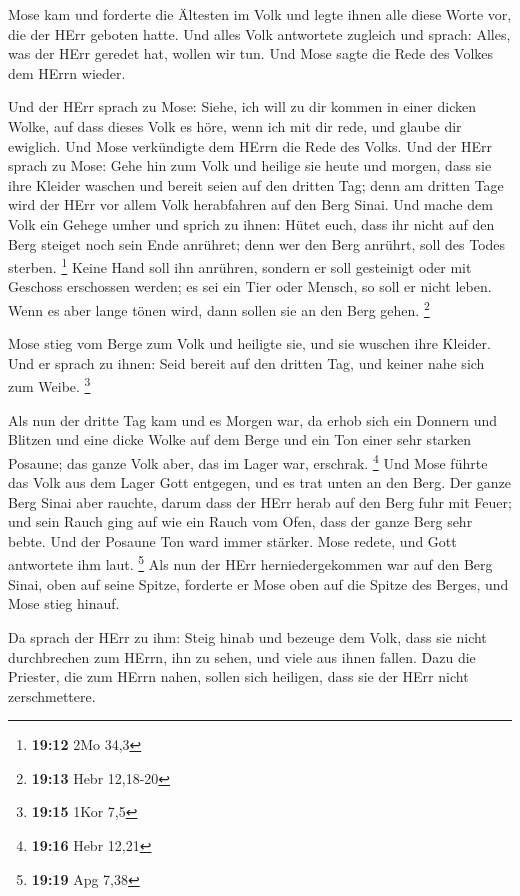  Mose kam und forderte die Ältesten im Volk und legte ihnen
alle diese Worte vor, die der HErr geboten hatte.  Und alles
Volk antwortete zugleich und sprach: Alles, was der HErr geredet hat,
wollen wir tun. Und Mose sagte die Rede des Volkes dem HErrn wieder.

 Und der HErr sprach zu Mose: Siehe, ich will zu dir kommen
in einer dicken Wolke, auf dass dieses Volk es höre, wenn ich mit dir
rede, und glaube dir ewiglich. Und Mose verkündigte dem HErrn die Rede
des Volks.  Und der HErr sprach zu Mose: Gehe hin zum Volk
und heilige sie heute und morgen, dass sie ihre Kleider waschen
 und bereit seien auf den dritten Tag; denn am dritten Tage
wird der HErr vor allem Volk herabfahren auf den Berg Sinai.
 Und mache dem Volk ein Gehege umher und sprich zu ihnen:
Hütet euch, dass ihr nicht auf den Berg steiget noch sein Ende anrühret;
denn wer den Berg anrührt, soll des Todes sterben. \footnote{\textbf{19:12}
  2Mo 34,3}  Keine Hand soll ihn anrühren, sondern er soll
gesteinigt oder mit Geschoss erschossen werden; es sei ein Tier oder
Mensch, so soll er nicht leben. Wenn es aber lange tönen wird, dann
sollen sie an den Berg gehen. \footnote{\textbf{19:13} Hebr 12,18-20}

 Mose stieg vom Berge zum Volk und heiligte sie, und sie
wuschen ihre Kleider.  Und er sprach zu ihnen: Seid bereit
auf den dritten Tag, und keiner nahe sich zum Weibe. \footnote{\textbf{19:15}
  1Kor 7,5}

 Als nun der dritte Tag kam und es Morgen war, da erhob
sich ein Donnern und Blitzen und eine dicke Wolke auf dem Berge und ein
Ton einer sehr starken Posaune; das ganze Volk aber, das im Lager war,
erschrak. \footnote{\textbf{19:16} Hebr 12,21}  Und Mose
führte das Volk aus dem Lager Gott entgegen, und es trat unten an den
Berg.  Der ganze Berg Sinai aber rauchte, darum dass der
HErr herab auf den Berg fuhr mit Feuer; und sein Rauch ging auf wie ein
Rauch vom Ofen, dass der ganze Berg sehr bebte.  Und der
Posaune Ton ward immer stärker. Mose redete, und Gott antwortete ihm
laut. \footnote{\textbf{19:19} Apg 7,38}  Als nun der HErr
herniedergekommen war auf den Berg Sinai, oben auf seine Spitze,
forderte er Mose oben auf die Spitze des Berges, und Mose stieg hinauf.

 Da sprach der HErr zu ihm: Steig hinab und bezeuge dem
Volk, dass sie nicht durchbrechen zum HErrn, ihn zu sehen, und viele aus
ihnen fallen.  Dazu die Priester, die zum HErrn nahen,
sollen sich heiligen, dass sie der HErr nicht zerschmettere.

